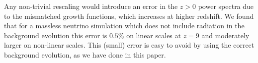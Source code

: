 \documentclass[useAMS, usenatbib]{mnras}
\begin{document}
Any non-trivial rescaling would introduce an error in the $z > 0$ power spectra due to the mismatched growth functions, which increases at higher redshift. We found that for a massless neutrino simulation which does not include radiation in the background evolution this error is $0.5\%$ on linear scales at $z=9$ and moderately larger on non-linear scales. This (small) error is easy to avoid by using the correct background evolution, as we have done in this paper.

\label{lastpage}


\end{document}
